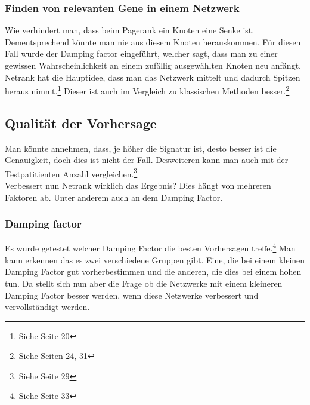 \documentclass{article}
\begin{document}
\subsubsection{Finden von relevanten Gene in einem Netzwerk}
Wie verhindert man, dass beim Pagerank ein Knoten eine Senke ist. Dementsprechend könnte man nie aus diesem Knoten herauskommen. Für diesen Fall wurde der Damping factor eingeführt, welcher sagt, dass man zu einer gewissen Wahrscheinlichkeit an einem zufällig ausgewählten Knoten neu anfängt.\\
Netrank hat die Hauptidee, dass man das Netzwerk mittelt und dadurch Spitzen heraus nimmt.\footnote{Siehe Seite 20} Dieser ist auch im Vergleich zu klassischen Methoden besser.\footnote{Siehe Seiten 24, 31}
\subsection{Qualität der Vorhersage}
Man könnte annehmen, dass, je höher die Signatur ist, desto besser ist die Genauigkeit, doch dies ist nicht der Fall. Desweiteren kann man auch mit der Testpatitienten Anzahl vergleichen.\footnote{Siehe Seite 29}\\
Verbessert nun Netrank wirklich das Ergebnis? Dies hängt von mehreren Faktoren ab. Unter anderem auch an dem Damping Factor.
\subsubsection{Damping factor}
Es wurde getestet welcher Damping Factor die besten Vorhersagen treffe.\footnote{Siehe Seite 33} Man kann erkennen das es zwei verschiedene Gruppen gibt. Eine, die bei einem kleinen Damping Factor gut vorherbestimmen und die anderen, die dies bei einem hohen tun. Da stellt sich nun aber die Frage ob die Netzwerke mit einem kleineren Damping Factor besser werden, wenn diese Netzwerke verbessert und vervollständigt werden.
\end{document}
